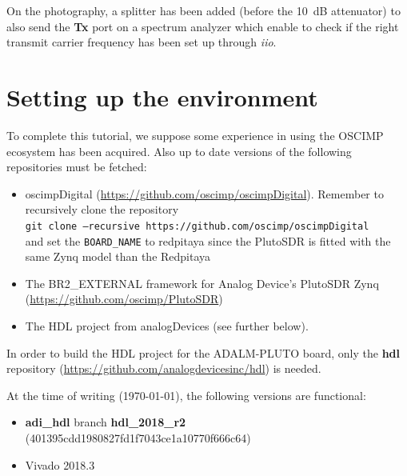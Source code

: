\documentclass{article}
\begin{document}
On the photography, a splitter has been added (before the 10~dB attenuator) to also send the 
{\bf Tx} port on a spectrum analyzer which enable to check if the right transmit carrier frequency 
has been set up through {\it iio}. 

\section{Setting up the environment}
To complete this tutorial, we suppose some experience in using the \mbox{OSCIMP} ecosystem has
been acquired. Also up to date versions of the following repositories must be fetched:
	\begin{itemize}
		\item oscimpDigital (\href{https://github.com/oscimp/oscimpDigital}{https://github.com/oscimp/oscimpDigital}). Remember to recursively clone the repository\\
{\tt git clone --recursive https://github.com/oscimp/oscimpDigital} \\
and set the {\tt BOARD\_NAME} to redpitaya since the PlutoSDR is fitted with the same Zynq model than
the Redpitaya
		\item The BR2\_EXTERNAL framework for Analog Device's PlutoSDR Zynq \\ (\href{https://github.com/oscimp/PlutoSDR}{https://github.com/oscimp/PlutoSDR})
		\item The HDL project from analogDevices (see further below).
	\end{itemize}

In order to build the HDL project for the ADALM-PLUTO board, only the {\bf{hdl}} repository
(\href{https://github.com/analogdevicesinc/hdl}{https://github.com/analogdevicesinc/hdl}) is needed.

\smallskip
At the time of writing (\today), the following versions are functional:
	\begin{itemize}
		\item {\bf{adi\_hdl}} branch {\bf{hdl\_2018\_r2}} (401395cdd1980827fd1f7043ce1a10770f666c64)
		\item Vivado 2018.3
	\end{itemize}
\end{document}
